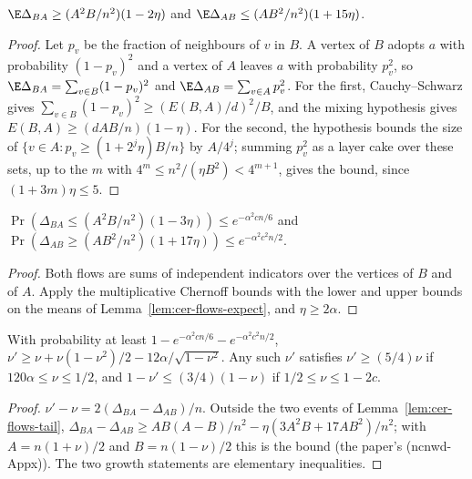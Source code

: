 \begin{lemma}\label{lem:cer-flows-expect}
\leanok{}
$\E\Delta_{BA}\ge(A^2B/n^2)(1-2\eta)$ and $\E\Delta_{AB}\le(AB^2/n^2)(1+15\eta)$.
\end{lemma}
\begin{proof}\leanok
Let $p_v$ be the fraction of neighbours of $v$ in $B$. A vertex of $B$ adopts $a$ with probability
$(1-p_v)^2$ and a vertex of $A$ leaves $a$ with probability $p_v^2$, so
$\E\Delta_{BA}=\sum_{v\in B}(1-p_v)^2$ and $\E\Delta_{AB}=\sum_{v\in A}p_v^2$. For the first,
Cauchy--Schwarz gives $\sum_{v\in B}(1-p_v)^2\ge(E(B,A)/d)^2/B$, and the mixing hypothesis gives
$E(B,A)\ge(dAB/n)(1-\eta)$. For the second, the hypothesis bounds the size of
$\{v\in A:p_v\ge(1+2^j\eta)B/n\}$ by $A/4^j$; summing $p_v^2$ as a layer cake over these sets,
up to the $m$ with $4^m\le n^2/(\eta B^2)<4^{m+1}$, gives the bound, since $(1+3m)\eta\le5$.
\end{proof}

\begin{lemma}\label{lem:cer-flows-tail}
\leanok{}
$\Pr(\Delta_{BA}\le(A^2B/n^2)(1-3\eta))\le e^{-\alpha^2cn/6}$ and
$\Pr(\Delta_{AB}\ge(AB^2/n^2)(1+17\eta))\le e^{-\alpha^2c^2n/2}$.
\end{lemma}
\begin{proof}\leanok
Both flows are sums of independent indicators over the vertices of $B$ and of $A$. Apply the
multiplicative Chernoff bounds with the lower and upper bounds on the means of
Lemma~\ref{lem:cer-flows-expect}, and $\eta\ge2\alpha$.
\end{proof}

\begin{lemma}\label{lem:cer-phaseI-step}
\leanok{}
With probability at least $1-e^{-\alpha^2cn/6}-e^{-\alpha^2c^2n/2}$,
$\nu'\ge\nu+\nu(1-\nu^2)/2-12\alpha/\sqrt{1-\nu^2}$. Any such $\nu'$ satisfies
$\nu'\ge(5/4)\nu$ if $120\alpha\le\nu\le1/2$, and $1-\nu'\le(3/4)(1-\nu)$ if
$1/2\le\nu\le1-2c$.
\end{lemma}
\begin{proof}\leanok
$\nu'-\nu=2(\Delta_{BA}-\Delta_{AB})/n$. Outside the two events of Lemma~\ref{lem:cer-flows-tail},
$\Delta_{BA}-\Delta_{AB}\ge AB(A-B)/n^2-\eta(3A^2B+17AB^2)/n^2$; with $A=n(1+\nu)/2$ and
$B=n(1-\nu)/2$ this is the bound (the paper's (ncnwd-Appx)). The two growth statements are
elementary inequalities.
\end{proof}

